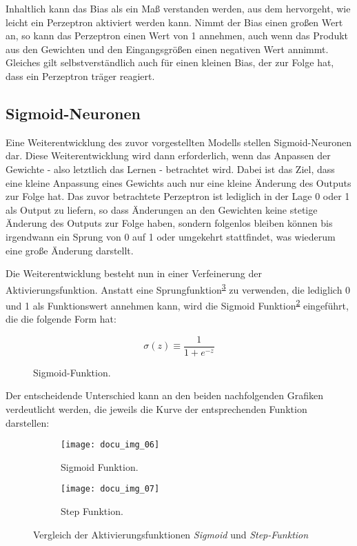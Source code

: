 Inhaltlich kann das Bias als ein Maß verstanden werden, aus dem hervorgeht, wie leicht ein Perzeptron aktiviert
werden kann. Nimmt der Bias einen großen Wert an, so kann das Perzeptron einen Wert von 1 annehmen, auch wenn das
Produkt aus den Gewichten und den Eingangsgrößen einen negativen Wert annimmt. Gleiches gilt selbstverständlich auch für
einen kleinen Bias, der zur Folge hat, dass ein Perzeptron träger reagiert.

\subsection{Sigmoid-Neuronen}

Eine Weiterentwicklung des zuvor vorgestellten Modells stellen Sigmoid-Neuronen dar. Diese Weiterentwicklung wird
dann erforderlich, wenn das Anpassen der Gewichte - also letztlich das Lernen - betrachtet wird. Dabei ist das Ziel,
dass eine kleine Anpassung eines Gewichts auch nur eine kleine Änderung des Outputs zur Folge hat. Das zuvor
betrachtete Perzeptron ist lediglich in der Lage 0 oder 1 als Output zu liefern, so dass Änderungen an den Gewichten
keine stetige Änderung des Outputs zur Folge haben, sondern folgenlos bleiben können bis irgendwann ein Sprung von 0
auf 1 oder umgekehrt stattfindet, was wiederum eine große Änderung darstellt.

Die Weiterentwicklung besteht nun in einer Verfeinerung der Aktivierungsfunktion. Anstatt eine Sprungfunktion\textsuperscript{\ref{fig:step-function}} zu
verwenden, die lediglich 0 und 1 als Funktionswert annehmen kann, wird die Sigmoid Funktion\textsuperscript{\ref{fig:sigmoid-function}} eingeführt,
die die folgende Form hat:

\begin{figure}[h]
    \centering
    \[ \sigma(z) \equiv
          \frac{1}{1+e^{-z}}
    \]
    \caption{Sigmoid-Funktion.}
    \label{fig:sigmoid}
\end{figure}

Der entscheidende Unterschied kann an den beiden nachfolgenden Grafiken verdeutlicht werden, die jeweils die Kurve
der entsprechenden Funktion darstellen:

\captionsetup[subfigure]{labelformat=empty, labelsep=none}
\begin{figure}[h]
    \centering
    \begin{subfigure}{0.45\textwidth}
		\texttt{[image: docu\_img\_06]}
		\caption{\tiny{Sigmoid Funktion.}}
		\label{fig:sigmoid-function}
	\end{subfigure}
    \begin{subfigure}{0.45\textwidth}
		\texttt{[image: docu\_img\_07]}
		\caption{\tiny{Step Funktion.}}
		\label{fig:step-function}
	\end{subfigure}

    \caption{Vergleich der Aktivierungsfunktionen \textit{Sigmoid} und \textit{Step-Funktion}}
    \label{fig:activation-functions}
\end{figure}

